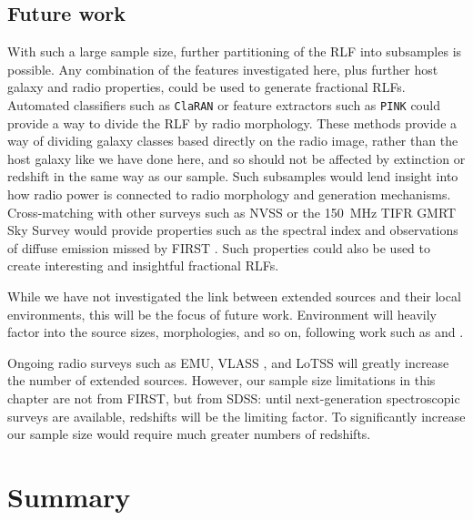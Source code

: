 \documentclass[11pt, a4paper]{book}
\begin{document}
  \subsection{Future work}

    With such a large sample size, further partitioning of the RLF into subsamples is possible. Any combination of the features investigated here, plus further host galaxy and radio properties, could be used to generate fractional RLFs. Automated classifiers such as \texttt{ClaRAN} \citep{wu19claran} or feature extractors such as \texttt{PINK} \citep{polsterer15pink,galvin19som,ralph19ae} could provide a way to divide the RLF by radio morphology. These methods provide a way of dividing galaxy classes based directly on the radio image, rather than the host galaxy like we have done here, and so should not be affected by extinction or redshift in the same way as our sample. Such subsamples would lend insight into how radio power is connected to radio morphology and generation mechanisms. Cross-matching with other surveys such as NVSS or the 150~MHz TIFR GMRT Sky Survey would provide properties such as the spectral index and observations of diffuse emission missed by FIRST \citep[as used by][]{kimball08}. Such properties could also be used to create interesting and insightful fractional RLFs.

    While we have not investigated the link between extended sources and their local environments, this will be the focus of future work. Environment will heavily factor into the source sizes, morphologies, and so on, following work such as \citet{rodman19asymmetry} and \citet{garon19bending}.

    Ongoing radio surveys such as EMU, VLASS \citep{lacy20vlass}, and LoTSS \linebreak \citep{shimwell19lotss} will greatly increase the number of extended sources. However, our sample size limitations in this chapter are not from FIRST, but from SDSS: until next-generation spectroscopic surveys are available, redshifts will be the limiting factor. To significantly increase our sample size would require much greater numbers of redshifts.

\section{Summary}\label{sec:rlfs-summary}
\end{document}
